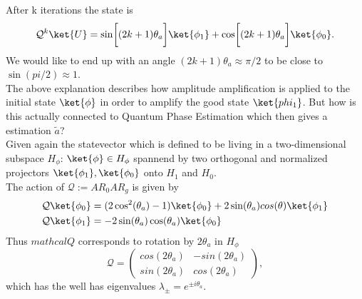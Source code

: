 \documentclass[../../main.tex]{subfiles}
\begin{document}
After k iterations the state is 
\begin{equation}\label{eq:Qktimes}
\mathcal{Q}^k \ket{U} = \sin \biggl[ (2k+1)\theta_a \biggr] \ket{\phi_1} + \cos \biggl[ (2k+1)\theta_a \biggr] \ket{\phi_0}.
\end{equation}
We would like to end up with an angle $(2k+1)\theta_a \approx \pi/2$ to be close to $\sin(pi/2) \approx 1$.\\
The above explanation describes how amplitude amplification is applied to the initial state $\ket{\phi}$ in order to amplify the good state $\ket{phi_1}$.
But how is this actually connected to Quantum Phase Estimation which then gives a estimation $\tilde{a}$?\\
Given again the statevector which is defined to be living in a two-dimensional subspace $H_{\phi}$: $\ket{\phi} \in H_{\phi}$ spannend by two orthogonal and normalized
projectors $\ket{\phi_1}, \ket{\phi_0}$ onto $H_1$ and $H_0$.\\
The action of $\mathcal{Q} := AR_0AR_g$ is given by
\begin{align}\label{eq:actionOfQ}
  \mathcal{Q} \ket{\phi_0} &= (2 \cos^2(\theta_a) - 1 )\ket{\phi_0} + 2 \sin(\theta_a)cos(\theta) \ket{\phi_1}\\
  \mathcal{Q} \ket{\phi_1} &= -2 \sin(\theta_a) \cos(\theta_a) \ket{\phi_0} 
\end{align}
Thus $mathcal{Q}$ corresponds to rotation by $2\theta_a$ in $H_\phi$
\begin{equation}\label{eq:rotationMatrix}
  \mathcal{Q} = 
\begin{pmatrix}
      cos(2\theta_a) & -sin(2 \theta_a) \\
      sin(2\theta_a) & cos(2 \theta_a) 
\end{pmatrix},
\end{equation}
which has the well has eigenvalues $\lambda_{\pm} = e^{\pm i \theta_a}$.\\
\end{document}
